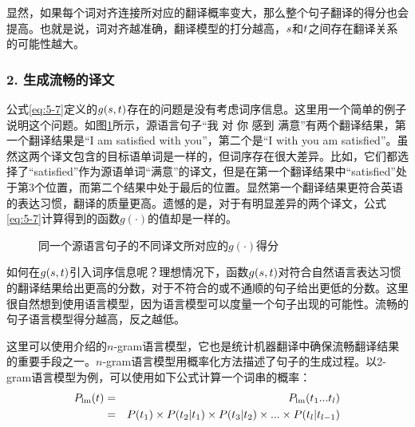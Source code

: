 \parinterval  显然，如果每个词对齐连接所对应的翻译概率变大，那么整个句子翻译的得分也会提高。也就是说，词对齐越准确，翻译模型的打分越高，${s}$和${t}$之间存在翻译关系的可能性越大。


\subsubsection{2. 生成流畅的译文}

\parinterval 公式\eqref{eq:5-7}定义的$g({s},{t})$存在的问题是没有考虑词序信息。这里用一个简单的例子说明这个问题。如图\ref{fig:5-8}所示，源语言句子“我 对 你 感到 满意”有两个翻译结果，第一个翻译结果是“I am satisfied with you”，第二个是“I with you am satisfied”。虽然这两个译文包含的目标语单词是一样的，但词序存在很大差异。比如，它们都选择了“satisfied”作为源语单词“满意”的译文，但是在第一个翻译结果中“satisfied”处于第3个位置，而第二个结果中处于最后的位置。显然第一个翻译结果更符合英语的表达习惯，翻译的质量更高。遗憾的是，对于有明显差异的两个译文，公式\eqref{eq:5-7}计算得到的函数$g(\cdot)$的值却是一样的。

\begin{figure}[htp]
    \centering

    \caption{同一个源语言句子的不同译文所对应的$g(\cdot)$得分}
    \label{fig:5-8}
\end{figure}

\parinterval 如何在$g({s},{t})$引入词序信息呢？理想情况下，函数$g({s},{t})$对符合自然语言表达习惯的翻译结果给出更高的分数，对于不符合的或不通顺的句子给出更低的分数。这里很自然想到使用语言模型，因为语言模型可以度量一个句子出现的可能性。流畅的句子语言模型得分越高，反之越低。

\parinterval 这里可以使用{\chaptertwo}介绍的$n$-gram语言模型，它也是统计机器翻译中确保流畅翻译结果的重要手段之一。$n$-gram语言模型用概率化方法描述了句子的生成过程。以2-gram语言模型为例，可以使用如下公式计算一个词串的概率：
\begin{eqnarray}
{P}_{\textrm{lm}}({t}) & = & {P}_{\textrm{lm}}(t_1...t_l) \nonumber \\
                                           & =  & {P}(t_1)\times {P}(t_2|t_1)\times {P}(t_3|t_2)\times ... \times {P}(t_l|t_{l-1})
\label{eq:5-9}
\end{eqnarray}

